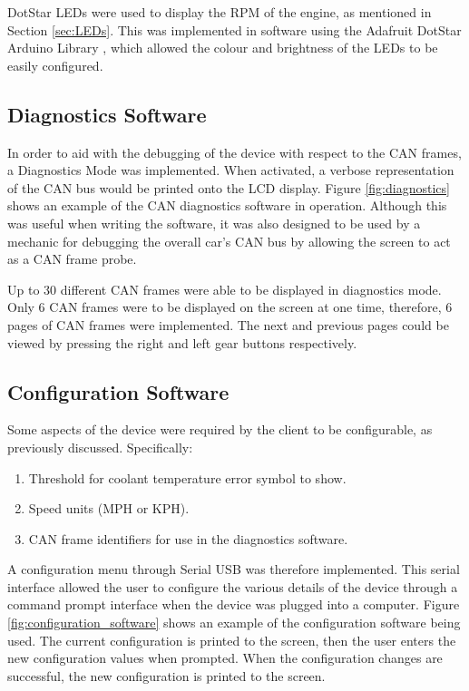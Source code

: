 \documentclass[a4paper,12pt]{article}
\begin{document}
DotStar LEDs were used to display the RPM of the engine, as mentioned in Section \ref{sec:LEDs}. This was implemented in software using the Adafruit DotStar Arduino Library \cite{dotstar_library}, which allowed the colour and brightness of the LEDs to be easily configured.

\subsection{Diagnostics Software}
\label{sec:diagnostics_software}

In order to aid with the debugging of the device with respect to the CAN frames, a Diagnostics Mode was implemented.  When activated, a verbose representation of the CAN bus would be printed onto the LCD display. Figure \ref{fig:diagnostics} shows an example of the CAN diagnostics software in operation. Although this was useful when writing the software, it was also designed to be used by a mechanic for debugging the overall car's CAN bus by allowing the screen to act as a CAN frame probe.



Up to 30 different CAN frames were able to be displayed in diagnostics mode. Only 6 CAN frames were to be displayed on the screen at one time, therefore, 6 pages of CAN frames were implemented. The next and previous pages could be viewed by pressing the right and left gear buttons respectively.

\subsection{Configuration Software}
\label{sec:configuration_software}

Some aspects of the device were required by the client to be configurable, as previously discussed. Specifically:

\begin{enumerate}
  \item Threshold for coolant temperature error symbol to show.
  \item Speed units (MPH or KPH).
  \item CAN frame identifiers for use in the diagnostics software.
\end{enumerate}

A configuration menu through Serial USB was therefore implemented. This serial interface allowed the user to configure the various details of the device through a command prompt interface when the device was plugged into a computer. Figure \ref{fig:configuration_software} shows an example of the configuration software being used. The current configuration is printed to the screen, then the user enters the new configuration values when prompted. When the configuration changes are successful, the new configuration is printed to the screen. \\
\end{document}
